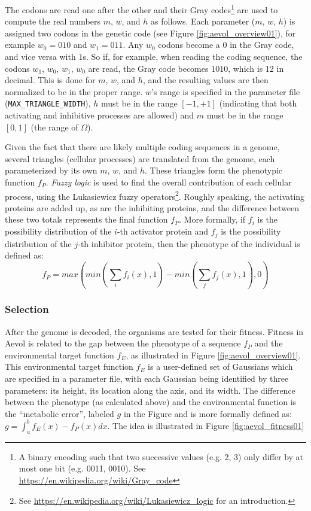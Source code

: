The codons are read one after the other and their Gray codes\footnote{A binary encoding such that two successive values (e.g. 2, 3) only differ by at most one bit (e.g. 0011, 0010). See \url{https://en.wikipedia.org/wiki/Gray_code}} are used to compute the real numbers $m$, $w$, and $h$ as follows. Each parameter ($m$, $w$, $h$) is assigned two codons in the genetic code (see Figure \ref{fig:aevol_overview01}), for example $w_0 = 010$ and $w_1 = 011$. Any $w_0$ codons become a $0$ in the Gray code, and vice versa with $1$s. So if, for example, when reading the coding sequence, the codons $w_1$, $w_0$, $w_1$, $w_0$ are read, the Gray code becomes $1010$, which is 12 in decimal. This is done for $m$, $w$, and $h$, and the resulting values are then normalized to be in the proper range. $w$'s range is specified in the parameter file (\texttt{MAX\_TRIANGLE\_WIDTH}), $h$ must be in the range $\left[-1,+1\right]$ (indicating that both activating and inhibitive processes are allowed) and $m$ must be in the range $\left[0,1\right]$ (the range of $\Omega$). 

Given the fact that there are likely multiple coding sequences in a genome, several triangles (cellular processes) are translated from the genome, each parameterized by its own $m$, $w$, and $h$. These triangles form the phenotypic function $f_P$. \textit{Fuzzy logic} is used to find the overall contribution of each cellular process, using the Lukasiewicz fuzzy operators\footnote{See \url{https://en.wikipedia.org/wiki/Lukasiewicz\_logic} for an introduction.}. Roughly speaking, the activating proteins are added up, as are the inhibiting proteins, and the difference between these two totals represents the final function $f_P$. More formally, if $f_i$ is the possibility distribution of the $i$-th activator protein and $f_j$ is the possibility distribution of the $j$-th inhibitor protein, then the phenotype of the individual is defined as:
\begin{equation*}
f_P = max\left(min\left(\sum_{i}^{}f_i(x),1 \right) - min\left(\sum_{j}^{}f_j(x),1 \right) ,0\right)
\end{equation*}

\subsubsection{Selection}\label{subsec:aevol_selection}
After the genome is decoded, the organisms are tested for their fitness. Fitness in Aevol is related to the gap between the phenotype of a sequence $f_P$ and the environmental  target function $f_E$, as illustrated in Figure \ref{fig:aevol_overview01}. This environmental target function $f_E$ is a user-defined set of Gaussians which are specified in a parameter file, with each Gaussian being identified by three parameters: its height, its location along the axis, and its width. The difference between the phenotype (as calculated above) and the environmental function is the ``metabolic error'', labeled $g$ in the Figure and is more formally defined as:  $g = \int_{a}^{b} f_E(x) - f_P(x) dx$. The idea is illustrated in Figure \ref{fig:aevol_fitness01}

